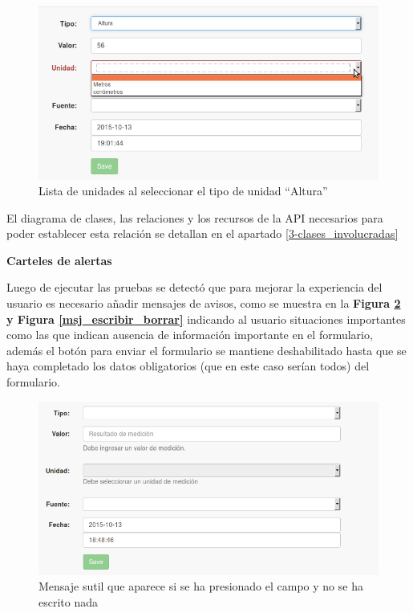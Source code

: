  \begin{figure}[h!]
  \centering
  \includegraphics[width=.8\textwidth]{img/3-unidad_altura}
  \caption{Lista de unidades al seleccionar el tipo de unidad ``Altura''}
  \label{unidad_altura}
\end{figure}


El diagrama de clases, las relaciones y los recursos de la API necesarios para poder establecer esta relación se detallan en el apartado \ref{3-clases_involucradas}

\textbf{Carteles de alertas}

Luego de ejecutar las pruebas se detectó que para mejorar la experiencia del usuario es necesario añadir mensajes de avisos, como se muestra en la \textbf{Figura \ref{msj_presiona_no_escribe} y Figura \ref{msj_escribir_borrar}} indicando al usuario situaciones importantes como las que indican ausencia de información importante en el formulario, además el botón para enviar el formulario se mantiene deshabilitado hasta que se haya completado los datos obligatorios (que en este caso serían todos) del formulario.


 \begin{figure}[h!]
  \centering
  \includegraphics[width=.8\textwidth]{img/3-presiona_no_escribe}
  \caption{Mensaje sutil que aparece  si se ha presionado el campo y no se ha escrito nada}
  \label{msj_presiona_no_escribe}
\end{figure}

